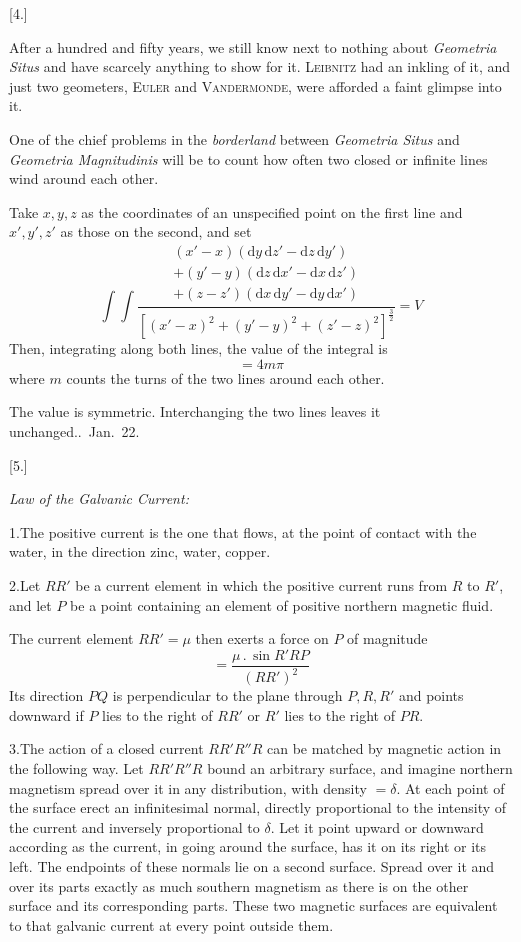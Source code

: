 \begin{center}[4.]\end{center}
After a hundred and fifty years, we still know next to nothing about \textit{Geometria Situs} and have scarcely anything to show for it. \textsc{Leibnitz} had an inkling of it, and just two geometers, \textsc{Euler} and \textsc{Vandermonde}, were afforded a faint glimpse into it.

One of the chief problems in the \textit{borderland} between \textit{Geometria Situs} and \textit{Geometria Magnitudinis} will be to count how often two closed or infinite lines wind around each other.

Take $x,y,z$ as the coordinates of an unspecified point on the first line and $x',y',z'$ as those on the second, and set
\[
\int\int\frac{\begin{gathered}
(x'-x)(\mathrm dy\,\mathrm dz'-\mathrm dz\,\mathrm dy')\\
+(y'-y)(\mathrm dz\,\mathrm dx'-\mathrm dx\,\mathrm dz')\\
+(z-z')(\mathrm dx\,\mathrm dy'-\mathrm dy\,\mathrm dx')
\end{gathered}}{[(x'-x)^2+(y'-y)^2+(z'-z)^2]^{\frac{3}{2}}}=V
\]
Then, integrating along both lines, the value of the integral is
\[
=4m\pi
\]
where $m$ counts the turns of the two lines around each other.

The value is symmetric. Interchanging the two lines leaves it unchanged..\ Jan.\ 22.

\begin{center}[5.]\par\medskip\textit{Law of the Galvanic Current:}\end{center}
1.\quad The positive current is the one that flows, at the point of contact with the water, in the direction zinc, water, copper.

2.\quad Let $RR'$ be a current element in which the positive current runs from $R$ to $R'$, and let $P$ be a point containing an element of positive northern magnetic fluid.

The current element $RR'=\mu$ then exerts a force on $P$ of magnitude
\[
=\frac{\mu\,.\,\sin R'RP}{(RR')^2}
\]
Its direction $PQ$ is perpendicular to the plane through $P,R,R'$ and points downward if $P$ lies to the right of $RR'$ or $R'$ lies to the right of $PR$.
\par
{}
3.\quad The action of a closed current $RR'R''R$ can be matched by magnetic action in the following way. Let $RR'R''R$ bound an arbitrary surface, and imagine northern magnetism spread over it in any distribution, with density $=\delta$. At each point of the surface erect an infinitesimal normal, directly proportional to the intensity of the current and inversely proportional to $\delta$. Let it point upward or downward according as the current, in going around the surface, has it on its right or its left. The endpoints of these normals lie on a second surface. Spread over it and over its parts exactly as much southern magnetism as there is on the other surface and its corresponding parts. These two magnetic surfaces are equivalent to that galvanic current at every point outside them.

